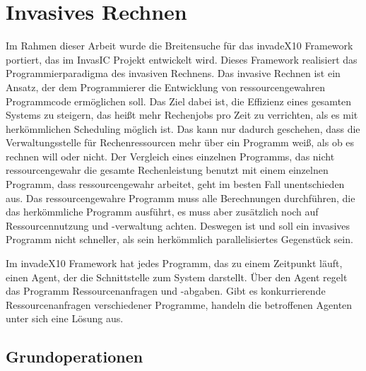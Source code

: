 \section{Invasives Rechnen} %
\label{sec:invasives_rechnen}
Im Rahmen dieser Arbeit wurde die Breitensuche für das invadeX10 Framework \cite{SWB-367212986} portiert, das im InvasIC Projekt entwickelt wird. Dieses Framework realisiert das Programmierparadigma des invasiven Rechnens. Das invasive Rechnen ist ein Ansatz, der dem Programmierer die Entwicklung von ressourcengewahren Programmcode ermöglichen soll. Das Ziel dabei ist, die Effizienz eines gesamten Systems zu steigern, das heißt mehr Rechenjobs pro Zeit zu verrichten, als es mit herkömmlichen Scheduling möglich ist. Das kann nur dadurch geschehen, dass die Verwaltungsstelle für Rechenressourcen mehr über ein Programm weiß, als ob es rechnen will oder nicht. Der Vergleich eines einzelnen Programms, das nicht ressourcengewahr die gesamte Rechenleistung benutzt mit einem einzelnen Programm, dass ressourcengewahr arbeitet, geht im besten Fall unentschieden aus. Das ressourcengewahre Programm muss alle Berechnungen durchführen, die das herkömmliche Programm ausführt, es muss aber zusätzlich noch auf Ressourcennutzung und -verwaltung achten. Deswegen ist und soll ein invasives Programm nicht schneller, als sein herkömmlich parallelisiertes Gegenstück sein.

Im invadeX10 Framework hat jedes Programm, das zu einem Zeitpunkt läuft, einen Agent, der die Schnittstelle zum System darstellt. Über den Agent regelt das Programm Ressourcenanfragen und -abgaben. Gibt es konkurrierende Ressourcenanfragen verschiedener Programme, handeln die betroffenen Agenten unter sich eine Lösung aus.
\subsection{Grundoperationen} %
\label{sub:grundoperationen}

